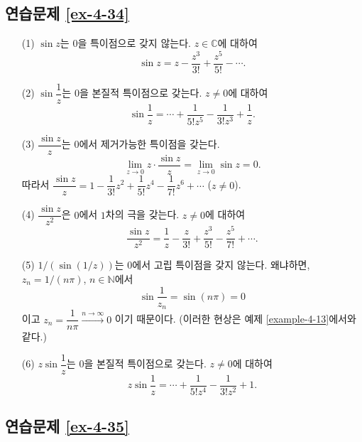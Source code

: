 \subsection*{연습문제 \ref{ex-4-34}}

\begin{itemize}
\item[(1)]  $\sin z$는 $0$을 특이점으로 갖지 않는다.
$z\in \mathbb C$에 대하여
\[
\sin z = z - \dfrac{z^3}{3!} + \dfrac{z^5}{5!} - \cdots.
\]
\item[(2)] $\sin \dfrac1z$는 $0$을 본질적 특이점으로 갖는다. $z\ne0$에 대하여
\[
\sin \dfrac1z = \cdots + \dfrac1{5!z^5} - \dfrac1{3!z^3} + \dfrac1z.
\]
\item[(3)]  $\dfrac{\sin z}z$는 $0$에서 제거가능한 특이점을 갖는다.
\[
\lim_{z\to 0} z\cdot \dfrac{\sin z}z = \lim_{z\to 0} \sin z = 0.
\]
따라서 $\dfrac{\sin z}{z} = 1  - \dfrac1{3!}z^2  + \dfrac1{5!}z^4 - \dfrac1{7!}z^6 + \cdots$
($z\ne0$).
\item[(4)] $\dfrac{\sin z}{z^2}$은 $0$에서 $1$차의 극을 갖는다.
$z\ne0$에 대하여
\[
\dfrac{\sin z}{z^2} = \dfrac1z - \dfrac z{3!} + \dfrac{z^3}{5!} - \dfrac{z^5}{7!} + \cdots.
\]
\item[(5)] $1/(\sin(1/z))$는 $0$에서 고립 특이점을 갖지 않는다. 왜냐하면,
$z_n = 1/(n\pi)$, $n\in\mathbb N$에서 
\[
\sin \dfrac1{z_n} = \sin(n\pi) = 0
\]
이고 $z_n = \dfrac1{n\pi} \stackrel{n\to\infty}{\longrightarrow} 0$
이기 때문이다. (이러한 현상은 예제 \ref{example-4-13}에서와 같다.)
\item[(6)] $z\sin\dfrac1z$는 $0$을 본질적 특이점으로 갖는다.
$z\ne0$에 대하여
\[
z\sin \dfrac1z = \cdots + \dfrac1{5!z^4} - \dfrac1{3!z^2} +1.
\]
\end{itemize}

\subsection*{연습문제 \ref{ex-4-35}}

